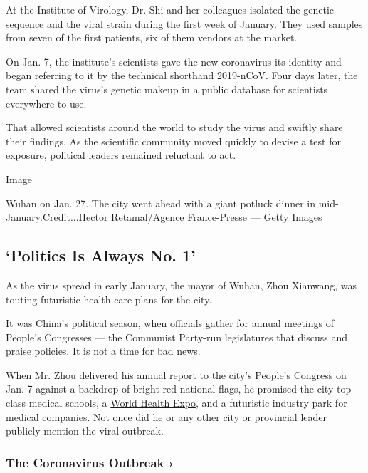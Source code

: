 At the Institute of Virology, Dr. Shi and her colleagues isolated the
genetic sequence and the viral strain during the first week of January.
They used samples from seven of the first patients, six of them vendors
at the market.

On Jan. 7, the institute's scientists gave the new coronavirus its
identity and began referring to it by the technical shorthand 2019-nCoV.
Four days later, the team shared the virus's genetic makeup in a public
database for scientists everywhere to use.

That allowed scientists around the world to study the virus and swiftly
share their findings. As the scientific community moved quickly to
devise a test for exposure, political leaders remained reluctant to act.

Image

Wuhan on Jan. 27. The city went ahead with a giant potluck dinner in
mid-January.Credit...Hector Retamal/Agence France-Presse --- Getty
Images

\hypertarget{politics-is-always-no-1}{%
\subsection{`Politics Is Always No. 1'}\label{politics-is-always-no-1}}

As the virus spread in early January, the mayor of Wuhan, Zhou Xianwang,
was touting futuristic health care plans for the city.

It was China's political season, when officials gather for annual
meetings of People's Congresses --- the Communist Party-run legislatures
that discuss and praise policies. It is not a time for bad news.

When Mr. Zhou \href{http://www.whtv.com.cn/p/19064.html}{delivered his
annual report} to the city's People's Congress on Jan. 7 against a
backdrop of bright red national flags, he promised the city top-class
medical schools, a \href{https://www.hbwhexpo.com/}{World Health Expo},
and a futuristic industry park for medical companies. Not once did he or
any other city or provincial leader publicly mention the viral outbreak.

\href{https://www.nytimes3xbfgragh.onion/news-event/coronavirus?action=click\&pgtype=Article\&state=default\&region=MAIN_CONTENT_3\&context=storylines_faq}{}

\hypertarget{the-coronavirus-outbreak-}{%
\subsubsection{The Coronavirus Outbreak
›}\label{the-coronavirus-outbreak-}}


